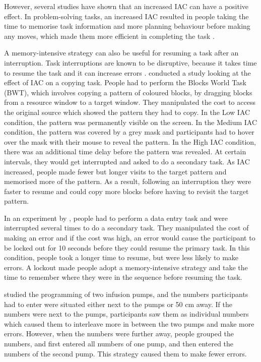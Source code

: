 \documentclass[11pt,oneside]{report}
\begin{document}
However, several studies have shown that an increased IAC can have a positive effect. In problem-solving tasks, an increased IAC resulted in people taking the time to memorise task information and more planning behaviour before making any moves, which made them more efficient in completing the task \citep[e.g.][]{Morgan2007, Morgan2012}. 

A memory-intensive strategy can also be useful for resuming a task after an interruption. Task interruptions are known to be disruptive, because it takes time to resume the task and it can increase errors \citep{Back2010, Brumby2013, Morgan2009}. 
\citet{Morgan2009} conducted a study looking at the effect of IAC on a copying task. People had to perform the Blocks World Task (BWT), which involves copying a pattern of coloured blocks, by dragging blocks from a resource window to a target window. They manipulated the cost to access the original source which showed the pattern they had to copy. In the Low IAC condition, the pattern was permanently visible on the screen. In the Medium IAC condition, the pattern was covered by a grey mask and participants had to hover over the mask with their mouse to reveal the pattern. In the High IAC condition, there was an additional time delay before the pattern was revealed. At certain intervals, they would get interrupted and asked to do a secondary task. As IAC increased, people made fewer but longer visits to the target pattern and memorised more of the pattern. As a result, following an interruption they were faster to resume and could copy more blocks before having to revisit the target pattern. 

In an experiment by \citet{Brumby2013}, people had to perform a data entry task and were interrupted several times to do a secondary task. They manipulated the cost of making an error and if the cost was high, an error would cause the participant to be locked out for 10 seconds before they could resume the primary task. In this condition, people took a longer time to resume, but were less likely to make errors. A lockout made people adopt a memory-intensive strategy and take the time to remember where they were in the sequence before resuming the task. 

\citet{Back2012} studied the programming of two infusion pumps, and the numbers participants had to enter were situated either next to the pumps or 50 cm away. If the numbers were next to the pumps, participants saw them as individual numbers which caused them to interleave more in between the two pumps and make more errors. 
However, when the numbers were further away, people grouped the numbers, and first entered all numbers of one pump, and then entered the numbers of the second pump. This strategy caused them to make fewer errors. 
\end{document}
